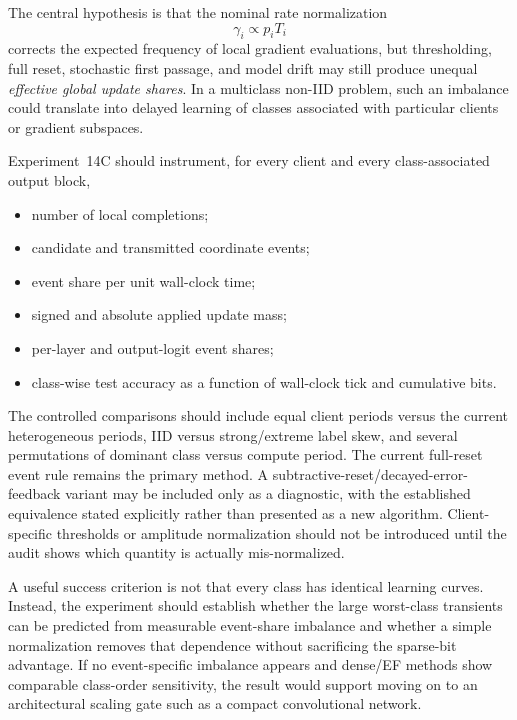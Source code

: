 The central hypothesis is that the nominal rate normalization
\begin{equation}
\gamma_i\propto p_iT_i
\end{equation}
corrects the expected frequency of local gradient evaluations, but thresholding, full reset, stochastic first passage, and model drift may still produce unequal \emph{effective global update shares}. In a multiclass non-IID problem, such an imbalance could translate into delayed learning of classes associated with particular clients or gradient subspaces.

Experiment~14C should instrument, for every client and every class-associated output block,
\begin{itemize}
    \item number of local completions;
    \item candidate and transmitted coordinate events;
    \item event share per unit wall-clock time;
    \item signed and absolute applied update mass;
    \item per-layer and output-logit event shares;
    \item class-wise test accuracy as a function of wall-clock tick and cumulative bits.
\end{itemize}

The controlled comparisons should include equal client periods versus the current heterogeneous periods, IID versus strong/extreme label skew, and several permutations of dominant class versus compute period. The current full-reset event rule remains the primary method. A subtractive-reset/decayed-error-feedback variant may be included only as a diagnostic, with the established equivalence stated explicitly rather than presented as a new algorithm. Client-specific thresholds or amplitude normalization should not be introduced until the audit shows which quantity is actually mis-normalized.

A useful success criterion is not that every class has identical learning curves. Instead, the experiment should establish whether the large worst-class transients can be predicted from measurable event-share imbalance and whether a simple normalization removes that dependence without sacrificing the sparse-bit advantage. If no event-specific imbalance appears and dense/EF methods show comparable class-order sensitivity, the result would support moving on to an architectural scaling gate such as a compact convolutional network.

